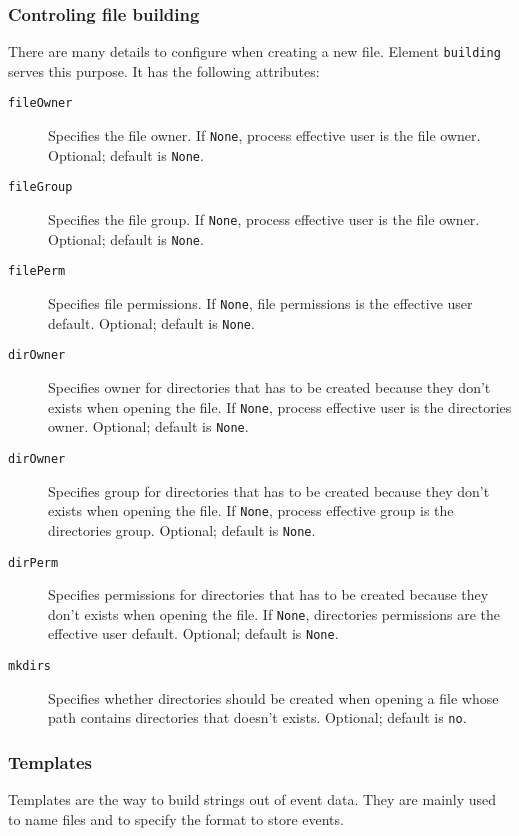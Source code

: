 \subsubsection{Controling file building}\label{target.common.building}
There are many details to configure when creating a new file.
Element {\tt building} serves this purpose.
It has the following attributes:
\begin{description}
  \item[{\tt fileOwner}]
    Specifies the file owner.
    If {\tt None}, process effective user is the file owner.
    Optional; default is {\tt None}.
  \item[{\tt fileGroup}]
    Specifies the file group.
    If {\tt None}, process effective user is the file owner.
    Optional; default is {\tt None}.
  \item[{\tt filePerm}]
    Specifies file permissions.
    If {\tt None}, file permissions is the effective user default.
    Optional; default is {\tt None}.
    
  \item[{\tt dirOwner}]
    Specifies owner for directories that has to be created
    because they don't exists when opening the file.
    If {\tt None}, process effective user is the directories owner.
    Optional; default is {\tt None}.
  \item[{\tt dirOwner}]
    Specifies group for directories that has to be created
    because they don't exists when opening the file.
    If {\tt None}, process effective group is the directories group.
    Optional; default is {\tt None}.
  \item[{\tt dirPerm}]
    Specifies permissions for directories that has to be created
    because they don't exists when opening the file.
    If {\tt None}, directories permissions are the effective user default.
    Optional; default is {\tt None}.
  
  \item[{\tt mkdirs}]
    Specifies whether directories should be created when opening a
    file whose path contains directories that doesn't exists.
    Optional; default is {\tt no}.
\end{description}

\subsubsection{Templates}\label{target.common.template}
Templates are the way to build strings out of event data.
They are mainly used to name files and to specify the format to store
events.

